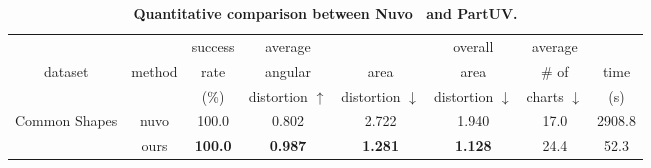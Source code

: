 \begin{table}[t]
  \centering
  \scriptsize
  \setlength{\tabcolsep}{2.4pt}
  \caption{\textbf{Quantitative comparison between Nuvo~\cite{srinivasan2024nuvo} and PartUV.}}
  \vspace{-2em}
    \begin{tabular}{c|c|cccccc}
    \toprule
      &       & \multicolumn{1}{c}{success}
              & \multicolumn{1}{c}{average}
              & \multicolumn{1}{c}{}
              & \multicolumn{1}{c}{overall}
              & \multicolumn{1}{c}{average}
              &  \\
              \multicolumn{1}{c|}{dataset}
              & \multicolumn{1}{c|}{method}
              & \multicolumn{1}{c}{rate}
                  & \multicolumn{1}{c}{angular}
                  & \multicolumn{1}{c}{area}
                  & \multicolumn{1}{c}{area}
                  & \multicolumn{1}{c}{\# of}
                  & \multicolumn{1}{c}{time} \\
        &
        & \multicolumn{1}{c}{(\%)}
        & \multicolumn{1}{c}{distortion $\uparrow$}
        & \multicolumn{1}{c}{distortion $\downarrow$}
        & \multicolumn{1}{c}{distortion $\downarrow$}
        & \multicolumn{1}{c}{charts $\downarrow$}
        & \multicolumn{1}{c}{ (s) } \\
    \midrule
    \multicolumn{1}{c|}{\multirow{2}[1]{*}{Common Shapes}} & nuvo  & 100.0 & 0.802 & 2.722 & \textcolor[rgb]{ .114,  .11,  .114}{1.940} & 17.0  & 2908.8 \\
          & ours  & \textbf{100.0} & \textbf{0.987} & \textbf{1.281} & \textbf{1.128} & 24.4  & 52.3 \\
    \bottomrule
    \end{tabular}%
  \label{tab:nuvo}%
\end{table}%
